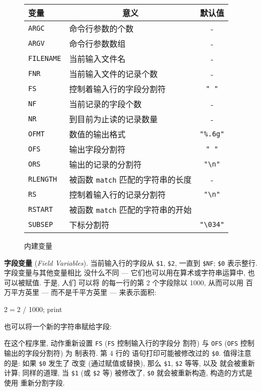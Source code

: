 \begin{figure}[ht]
\captionsetup{type=table}
\caption{内建变量}
\label{tbl:built_in_variables}
\begin{center}
\begin{tabular}{l|l|c}
	\hline
	\hline
	变量	& \multicolumn{1}{c|}{意义}	& 默认值 \\
	\hline
	\verb'ARGC'	& 命令行参数的个数	& - \\
	\verb'ARGV'	& 命令行参数数组	& - \\
	\verb'FILENAME'	& 当前输入文件名	& - \\
	\verb'FNR'	& 当前输入文件的记录个数& - \\
	\verb'FS'	& 控制着输入行的字段分割符 & \verb'" "' \\
	\verb'NF'	& 当前记录的字段个数	& - \\
	\verb'NR'	& 到目前为止读的记录数量 & - \\
	\verb'OFMT'	& 数值的输出格式	& \verb'"%.6g"' \\
	\verb'OFS'	& 输出字段分割符	& \verb'" "' \\
	\verb'ORS'	& 输出的记录的分割符	& \verb'"\n"'	\\
	\verb'RLENGTH'	& 被函数 \verb'match' 匹配的字符串的长度 & - \\
	\verb'RS'	& 控制着输入行的记录分割符 & \verb'"\n"'	\\
	\verb'RSTART'	& 被函数 \verb'match' 匹配的字符串的开始 \\
	\verb'SUBSEP'	& 下标分割符	& \verb'"\034"'	\\
	\hline
\end{tabular}
\end{center}
\end{figure}

\textbf{字段变量} (\emph{Field Variables}). 当前输入行的字段从 \verb'$1',
\verb'$2', 一直到 \verb'$NF'; \verb'$0' 表示整行. 字段变量与其他变量相比
没什么不同 --- 它们也可以用在算术或字符串运算中, 也可以被赋值. 于是, 人们
可以将  的每一行的第 2 个字段除以 1000, 从而可以用
百万平方英里 --- 而不是千平方英里 --- 来表示面积:
\begin{awkcode}
    { $2 = $2 / 1000; print }
\end{awkcode}
也可以将一个新的字符串赋给字段:
在这个程序里, \BEGIN 动作重新设置 \verb'FS' (\verb'FS' 控制输入行的字段分
割符) 与 \verb'OFS' (\verb'OFS' 控制输出的字段分割符) 为 制表符. 第 4 行的
\print 语句打印可能被修改过的 \verb'$0'. 值得注意的是: 如果 \verb'$0' 发生了
改变 (通过赋值或替换), 那么 \verb'$1', \verb'$2' 等等, 以及 \nf
就会被重新计算; 同样的道理, 当 \verb'$1' (或 \verb'$2' 等) 被修改了,
\verb'$0' 就会被重新构造, 构造的方式是使用 \OFS 重新分割字段.

